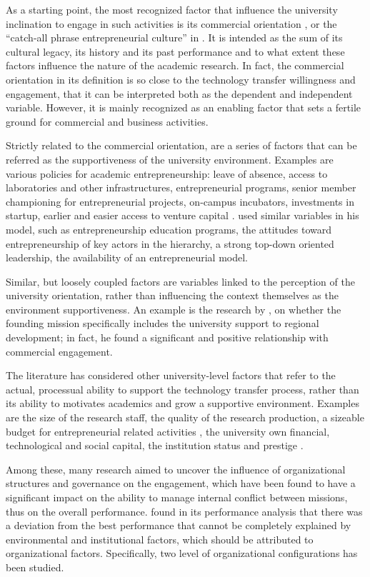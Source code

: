 As a starting point, the most recognized factor that influence the university inclination to engage in such activities is its commercial orientation \citep{DEste2007}, or the \enquote{catch-all phrase entrepreneurial culture} in \citet{OwenSmith2001}. It is intended as the sum of its cultural legacy, its history and its past performance and to what extent these factors influence the nature of the academic research. In fact, the commercial orientation in its definition is so close to the technology transfer willingness and engagement, that it can be interpreted both as the dependent and independent variable. However, it is mainly recognized as an enabling factor that sets a fertile ground for commercial and business activities. 

Strictly related to the commercial orientation, are a series of factors that can be referred as the supportiveness of the university environment. Examples are various policies for academic entrepreneurship: leave of absence, access to laboratories and other infrastructures, entrepreneurial programs, senior member championing for entrepreneurial projects, on-campus incubators, investments in startup, earlier and easier access to venture capital \citep{Baldini2007}. \citet{Guerrero2014} used similar variables in his model, such as entrepreneurship education programs, the attitudes toward entrepreneurship of key actors in the hierarchy, a strong top-down oriented leadership, the availability of an entrepreneurial model.

Similar, but loosely coupled factors are variables linked to the perception of the university orientation, rather than influencing the context themselves as the environment supportiveness. An example is the research by \citet{DEste2007}, on whether the founding mission specifically includes the university support to regional development; in fact, he found a significant and positive relationship with commercial engagement.

The literature has considered other university-level factors that refer to the actual, processual ability to support the technology transfer process, rather than its ability to motivates academics and grow a supportive environment. Examples are the size of the research staff, the quality of the research production, a sizeable budget for entrepreneurial related activities \citep{Colombo2010}, the university own financial, technological and social capital, the institution status and prestige \citep{Guerrero2014}.

Among these, many research aimed to uncover the influence of organizational structures and governance on the engagement, which have been found to have a significant impact on the ability to manage internal conflict between missions, thus on the overall performance. \citet{Siegel2003a} found in its performance analysis that there was a deviation from the best performance that cannot be completely explained by environmental and institutional factors, which should be attributed to organizational factors. Specifically, two level of organizational configurations has been studied.

